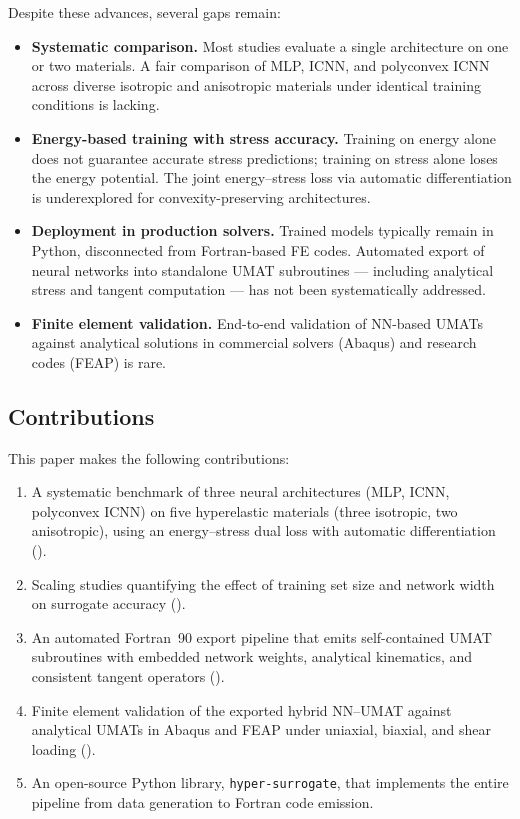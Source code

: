 Despite these advances, several gaps remain:
\begin{itemize}
  \item \textbf{Systematic comparison.}  Most studies evaluate a single
    architecture on one or two materials.  A fair comparison of MLP, ICNN,
    and polyconvex ICNN across diverse isotropic and anisotropic materials
    under identical training conditions is lacking.
  \item \textbf{Energy-based training with stress accuracy.}  Training on
    energy alone does not guarantee accurate stress predictions; training on
    stress alone loses the energy potential.  The joint energy--stress loss via
    automatic differentiation is underexplored for convexity-preserving
    architectures.
  \item \textbf{Deployment in production solvers.}  Trained models typically
    remain in Python, disconnected from Fortran-based FE codes.  Automated
    export of neural networks into standalone UMAT subroutines --- including
    analytical stress and tangent computation --- has not been systematically
    addressed.
  \item \textbf{Finite element validation.}  End-to-end validation of
    NN-based UMATs against analytical solutions in commercial solvers
    (Abaqus) and research codes (FEAP) is rare.
\end{itemize}

\subsection{Contributions}

This paper makes the following contributions:

\begin{enumerate}
  \item A systematic benchmark of three neural architectures (MLP, ICNN,
    polyconvex ICNN) on five hyperelastic materials (three isotropic, two
    anisotropic), using an energy--stress dual loss with automatic
    differentiation ().
  \item Scaling studies quantifying the effect of training set size and
    network width on surrogate accuracy ().
  \item An automated Fortran~90 export pipeline that emits self-contained
    UMAT subroutines with embedded network weights, analytical kinematics,
    and consistent tangent operators ().
  \item Finite element validation of the exported hybrid NN--UMAT against
    analytical UMATs in Abaqus and FEAP under uniaxial, biaxial, and shear
    loading ().
  \item An open-source Python library, \texttt{hyper-surrogate}, that
    implements the entire pipeline from data generation to Fortran code
    emission.
\end{enumerate}

